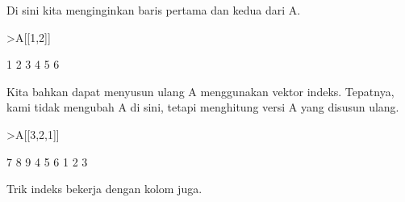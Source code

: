 \documentclass[a4paper,10pt]{article}
\begin{document}
\begin{eulernotebook}
\begin{eulercomment}
\begin{eulercomment}
\begin{eulercomment}
\begin{eulercomment}
\begin{eulercomment}
\begin{eulercomment}
\begin{eulercomment}
Di sini kita menginginkan baris pertama dan kedua dari A.
\end{eulercomment}
\begin{eulerprompt}
>A[[1,2]]
\end{eulerprompt}
\begin{euleroutput}
              1             2             3 
              4             5             6 
\end{euleroutput}
\begin{eulercomment}
Kita bahkan dapat menyusun ulang A menggunakan vektor indeks.
Tepatnya, kami tidak mengubah A di sini, tetapi menghitung versi A
yang disusun ulang.
\end{eulercomment}
\begin{eulerprompt}
>A[[3,2,1]]
\end{eulerprompt}
\begin{euleroutput}
              7             8             9 
              4             5             6 
              1             2             3 
\end{euleroutput}
\begin{eulercomment}
Trik indeks bekerja dengan kolom juga.


\end{eulercomment}
\end{eulercomment}
\end{eulercomment}
\end{eulercomment}
\end{eulercomment}
\end{eulercomment}
\end{eulercomment}
\end{eulernotebook}
\end{document}
